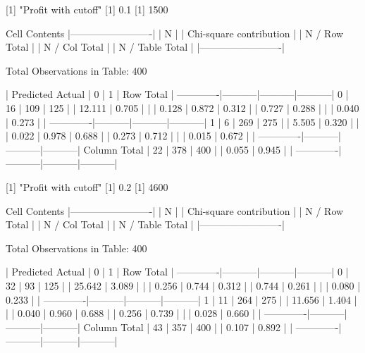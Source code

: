 \documentclass{article}
\begin{document}
\begin{Schunk}
\begin{Soutput}
 
[1] "Profit with cutoff"
[1] 0.1
[1] 1500

 
   Cell Contents
|-------------------------|
|                       N |
| Chi-square contribution |
|           N / Row Total |
|           N / Col Total |
|         N / Table Total |
|-------------------------|

 
Total Observations in Table:  400 

 
             | Predicted 
      Actual |         0 |         1 | Row Total | 
-------------|-----------|-----------|-----------|
           0 |        16 |       109 |       125 | 
             |    12.111 |     0.705 |           | 
             |     0.128 |     0.872 |     0.312 | 
             |     0.727 |     0.288 |           | 
             |     0.040 |     0.273 |           | 
-------------|-----------|-----------|-----------|
           1 |         6 |       269 |       275 | 
             |     5.505 |     0.320 |           | 
             |     0.022 |     0.978 |     0.688 | 
             |     0.273 |     0.712 |           | 
             |     0.015 |     0.672 |           | 
-------------|-----------|-----------|-----------|
Column Total |        22 |       378 |       400 | 
             |     0.055 |     0.945 |           | 
-------------|-----------|-----------|-----------|

 
[1] "Profit with cutoff"
[1] 0.2
[1] 4600

 
   Cell Contents
|-------------------------|
|                       N |
| Chi-square contribution |
|           N / Row Total |
|           N / Col Total |
|         N / Table Total |
|-------------------------|

 
Total Observations in Table:  400 

 
             | Predicted 
      Actual |         0 |         1 | Row Total | 
-------------|-----------|-----------|-----------|
           0 |        32 |        93 |       125 | 
             |    25.642 |     3.089 |           | 
             |     0.256 |     0.744 |     0.312 | 
             |     0.744 |     0.261 |           | 
             |     0.080 |     0.233 |           | 
-------------|-----------|-----------|-----------|
           1 |        11 |       264 |       275 | 
             |    11.656 |     1.404 |           | 
             |     0.040 |     0.960 |     0.688 | 
             |     0.256 |     0.739 |           | 
             |     0.028 |     0.660 |           | 
-------------|-----------|-----------|-----------|
Column Total |        43 |       357 |       400 | 
             |     0.107 |     0.892 |           | 
-------------|-----------|-----------|-----------|


\end{Soutput}
\end{Schunk}
\end{document}
